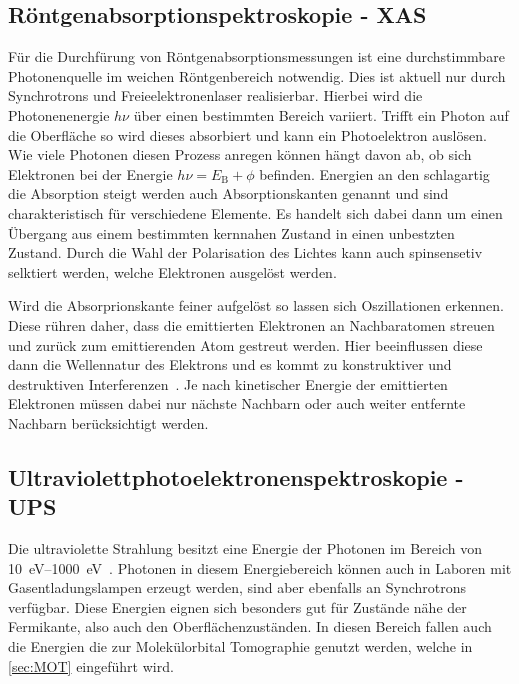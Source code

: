         \subsection{Röntgenabsorptionspektroskopie - XAS}
            Für die Durchfürung von Röntgenabsorptionsmessungen ist eine durchstimmbare Photonenquelle im weichen Röntgenbereich notwendig.
            Dies ist aktuell nur durch Synchrotrons und Freieelektronenlaser realisierbar.
            Hierbei wird die Photonenenergie $h\nu$ über einen bestimmten Bereich variiert. %
            Trifft ein Photon auf die Oberfläche so wird dieses absorbiert und kann ein Photoelektron auslösen.
            Wie viele Photonen diesen Prozess anregen können hängt davon ab, ob sich Elektronen bei der Energie $h\nu = E_\text{B}+\phi$ befinden.
            Energien an den schlagartig die Absorption steigt werden auch Absorptionskanten genannt und sind charakteristisch für verschiedene Elemente. 
            Es handelt sich dabei dann um einen Übergang aus einem bestimmten kernnahen Zustand in einen unbestzten Zustand.
            Durch die Wahl der Polarisation des Lichtes kann auch spinsensetiv selktiert werden, welche Elektronen ausgelöst werden.

            Wird die Absorprionskante feiner aufgelöst so lassen sich Oszillationen erkennen.
            Diese rühren daher, dass die emittierten Elektronen an Nachbaratomen streuen und zurück zum emittierenden Atom gestreut werden.
            Hier beeinflussen diese dann die Wellennatur des Elektrons und es kommt zu konstruktiver und destruktiven Interferenzen~\cite{Fauster}.
            Je nach kinetischer Energie der emittierten Elektronen müssen dabei nur nächste Nachbarn oder auch weiter entfernte Nachbarn berücksichtigt werden.

        \subsection{Ultraviolettphotoelektronenspektroskopie - UPS} \label{sec:UPS}
            Die ultraviolette Strahlung besitzt eine Energie der Photonen im Bereich von \SIrange{10}{1000}{\electronvolt}~\cite{Fauster}.
            Photonen in diesem Energiebereich können auch in Laboren mit Gasentladungslampen erzeugt werden, sind aber ebenfalls an Synchrotrons verfügbar.
            Diese Energien eignen sich besonders gut für Zustände nähe der Fermikante, also auch den Oberflächenzuständen.
            In diesen Bereich fallen auch die Energien die zur Molekülorbital Tomographie genutzt werden, welche in \autoref{sec:MOT} eingeführt wird.

